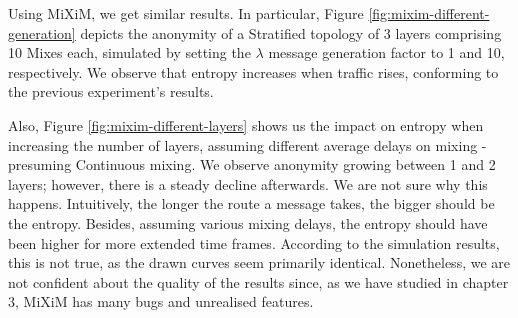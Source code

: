 \documentclass[logo,msc,cyber]{infthesis}   %
\begin{document}
 Using MiXiM, we get similar results. In particular, Figure \ref{fig:mixim-different-generation} depicts the
 anonymity of a Stratified topology of 3 layers comprising 10 Mixes each,
 simulated by setting the $\lambda$ message generation factor to 1 and 10,
 respectively. We observe that entropy increases when traffic rises, conforming
 to the previous experiment's results.

 Also, Figure \ref{fig:mixim-different-layers} shows us the impact on entropy when increasing the number of
 layers, assuming different average delays on mixing - presuming Continuous
 mixing. We observe anonymity growing between 1 and 2 layers; however, there is
 a steady decline afterwards. We are not sure why this happens.
 Intuitively, the longer the route a message takes, the bigger should be the
 entropy. Besides, assuming various mixing delays, the entropy should have been
 higher for more extended time frames. According to the simulation results, this
 is not true, as the drawn curves seem primarily identical. Nonetheless, we are
 not confident about the quality of the results since, as we have studied in
 chapter 3, MiXiM has many bugs and unrealised features.
\end{document}
